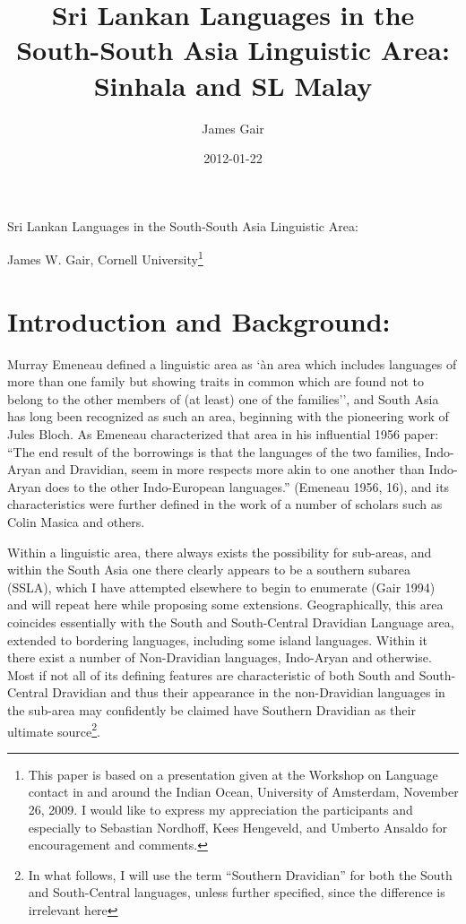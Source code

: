 \documentclass[letterpaper]{article}
\title{Sri Lankan Languages in the South-South Asia Linguistic Area: Sinhala and SL Malay}
\author{James Gair}
\date{2012-01-22}
\begin{document}
{\centering
\newline
Sri Lankan Languages in the South-South Asia Linguistic Area:
\par}


{\centering
James W. Gair, Cornell University\footnote{This
  paper is based on a presentation given at the Workshop on Language contact in and around the Indian Ocean, University of Amsterdam, November 26, 2009. I would like to express my appreciation the participants and especially to Sebastian Nordhoff, Kees Hengeveld, and Umberto Ansaldo for encouragement and comments.}
\par}

\section{Introduction and Background:}

Murray Emeneau defined a linguistic area as `àn area which includes languages of more than one family but showing traits in common which are found not to belong to the other members of (at least) one of the families'', and South Asia has long been recognized as such an area, beginning with the pioneering work of Jules Bloch. As Emeneau characterized that area in his influential 1956 paper: ``The end result of the borrowings is that the languages of the two families, Indo-Aryan and Dravidian, seem in more respects more akin to one another than Indo-Aryan does to the other Indo-European languages.'' (Emeneau 1956, 16), and its characteristics were further defined in the work of a number of scholars such as Colin Masica and others.

Within a linguistic area, there always exists the possibility for sub-areas, and within the South Asia one there clearly appears to be a southern subarea (SSLA), which I have attempted elsewhere to begin to enumerate (Gair 1994) and will repeat here while proposing some extensions. Geographically, this area coincides essentially with the South and South-Central Dravidian Language area, extended to bordering languages, including some island languages. Within it there exist a number of Non-Dravidian languages, Indo-Aryan and otherwise. Most if not all of its defining features are characteristic of both South and South-Central Dravidian and thus their appearance in the non-Dravidian languages in the sub-area may confidently be claimed have Southern Dravidian as their ultimate source\footnote{In
  what follows, I will use the term ``Southern Dravidian'' for both the South and South-Central languages, unless further specified, since the difference is irrelevant here}.
\end{document}
